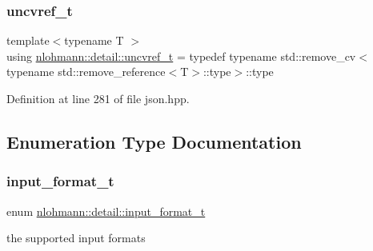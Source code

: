 \subsubsection{\texorpdfstring{uncvref\+\_\+t}{uncvref\_t}}
{\footnotesize\ttfamily template$<$typename T $>$ \\
using \hyperlink{namespacenlohmann_1_1detail_a53a082eedad9f4729fcd8fed552a21f7}{nlohmann\+::detail\+::uncvref\+\_\+t} = typedef typename std\+::remove\+\_\+cv$<$typename std\+::remove\+\_\+reference$<$T$>$\+::type$>$\+::type}



Definition at line 281 of file json.\+hpp.



\subsection{Enumeration Type Documentation}
\mbox{\label{namespacenlohmann_1_1detail_aa554fc6a11519e4f347deb25a9f0db40}} 
\subsubsection{\texorpdfstring{input\+\_\+format\+\_\+t}{input\_format\_t}}
{\footnotesize\ttfamily enum \hyperlink{namespacenlohmann_1_1detail_aa554fc6a11519e4f347deb25a9f0db40}{nlohmann\+::detail\+::input\+\_\+format\+\_\+t}\hspace{0.3cm}{\ttfamily [strong]}}



the supported input formats 

